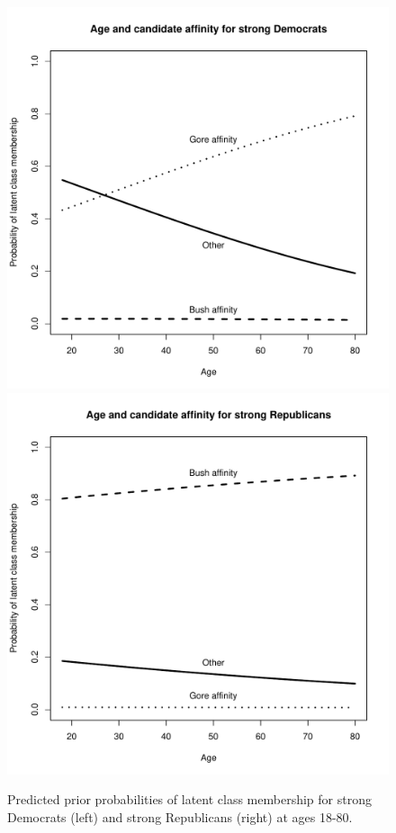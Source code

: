 \documentclass[letterpaper,12pt]{article}
\begin{document}
\begin{figure}
\centering \includegraphics[scale=0.4]{election-strdems.pdf} \includegraphics[scale=0.4]{election-strreps.pdf}
\caption{Predicted prior probabilities of latent class membership for strong Democrats (left) and strong Republicans (right) at ages 18-80.}
\label{f.election2}
\end{figure}
\end{document}
